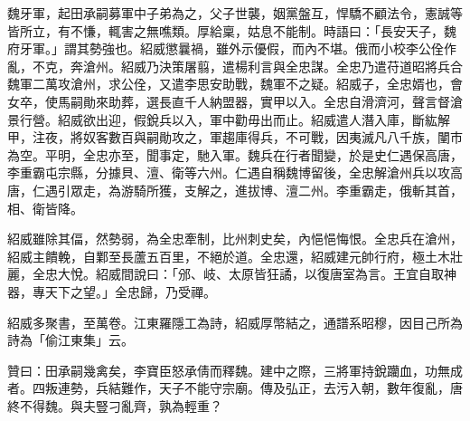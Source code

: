 \begin{pinyinscope}
 魏牙軍，起田承嗣募軍中子弟為之，父子世襲，姻黨盤互，悍驕不顧法令，憲誠等皆所立，有不慊，輒害之無噍類。厚給稟，姑息不能制。時語曰：「長安天子，魏府牙軍。」謂其勢強也。紹威懲曩禍，雖外示優假，而內不堪。俄而小校李公佺作亂，不克，奔滄州。紹威乃決策屠翦，遣楊利言與全忠謀。全忠乃遣苻道昭將兵合魏軍二萬攻滄州，求公佺，又遣李思安助戰，魏軍不之疑。紹威子，全忠婿也，會女卒，使馬嗣勛來助葬，選長直千人納盟器，實甲以入。全忠自滑濟河，聲言督滄景行營。紹威欲出迎，假銳兵以入，軍中勸毋出而止。紹威遣人潛入庫，斷紘解甲，注夜，將奴客數百與嗣勛攻之，軍趨庫得兵，不可戰，因夷滅凡八千族，闉市為空。平明，全忠亦至，聞事定，馳入軍。魏兵在行者聞變，於是史仁遇保高唐，李重霸屯宗縣，分據貝、澶、衛等六州。仁遇自稱魏博留後，全忠解滄州兵以攻高唐，仁遇引眾走，為游騎所獲，支解之，進拔博、澶二州。李重霸走，俄斬其首，相、衛皆降。



 紹威雖除其偪，然勢弱，為全忠牽制，比州刺史矣，內悒悒悔恨。全忠兵在滄州，紹威主饋輓，自鄴至長蘆五百里，不絕於道。全忠還，紹威建元帥行府，極土木壯麗，全忠大悅。紹威間說曰：「邠、岐、太原皆狂譎，以復唐室為言。王宜自取神器，專天下之望。」全忠歸，乃受禪。



 紹威多聚書，至萬卷。江東羅隱工為詩，紹威厚幣結之，通譜系昭穆，因目己所為詩為「偷江東集」云。



 贊曰：田承嗣幾禽矣，李寶臣怒承倩而釋魏。建中之際，三將軍持銳躪血，功無成者。四叛連勢，兵結難作，天子不能守宗廟。傳及弘正，去污入朝，數年復亂，唐終不得魏。與夫豎刁亂齊，孰為輕重？



\end{pinyinscope}
